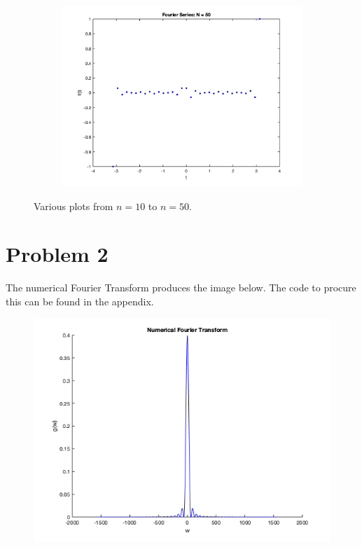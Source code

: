 \documentclass[12pt]{article}
\begin{document}
\begin{figure}[h!]
\begin{subfigure}{0.49\columnwidth}
\centering
\includegraphics[width=\textwidth]{fs_n_50.png}
\caption{}
\label{fig:time5}
\end{subfigure}

\caption{Various plots from $n = 10$ to $n = 50$.}
\label{fig:time}

\end{figure}

\newpage



\newpage


\newpage

\section*{Problem 2}

The numerical Fourier Transform produces the image below. The code to procure this can be found in the appendix.

\begin{figure}[h!]
    \centering
    {{\includegraphics[width=15cm]{numerical_ft.png}}}%
    \qquad
    \caption{ }%
    \label{fig:example}%
\end{figure}
\end{document}
